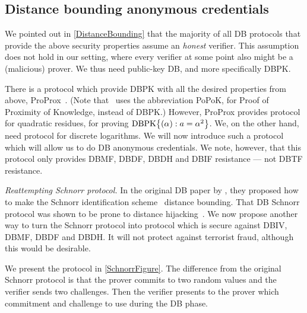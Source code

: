 \subsection{Distance bounding anonymous credentials}%
\label{DB-anon-cred}


We pointed out in \cref{DistanceBounding} that the majority of all \ac{DB} 
protocols that provide the above security properties assume an \emph{honest} 
verifier.
This assumption does not hold in our setting, where every verifier at some point 
also might be a (malicious) prover.
We thus need public-key \ac{DB}, and more specifically \ac{DBPK}.

There is a protocol which provide \ac{DBPK} with all the desired properties from 
above, ProProx~\cite{ProProx}.
(Note that~\cite{ProProx} uses the abbreviation PoPoK, for Proof of Proximity of 
Knowledge, instead of \ac{DBPK}.)
However, ProProx provides  protocol for quadratic residues, \ie for 
proving \(\DBPK[\alpha][a = \alpha^2]\).
We, on the other hand, need  protocol for discrete logarithms.
We will now introduce such a protocol which will allow us to do \ac{DB} 
anonymous credentials.
We note, however, that this protocol only provides \ac{DBMF}, \ac{DBDF}, 
\ac{DBDH} and \ac{DBIF} resistance --- \ie not \ac{DBTF} resistance.


\emph{Reattempting  Schnorr protocol.}
In the original \ac{DB} paper by \citet{DistanceBounding}, they proposed how to 
make the Schnorr identification scheme~\cite{Schnorr} distance bounding.
That \ac{DB} Schnorr protocol was shown to be prone to distance 
hijacking~\cite{DistanceHijacking}.
We now propose another way to turn the Schnorr protocol into  protocol 
which is secure against \ac{DBIV}, \ac{DBMF}, \ac{DBDF} and \ac{DBDH}.
It will not protect against terrorist fraud, although this would be desirable.

We present the protocol in \cref{SchnorrFigure}.
The difference from the original Schnorr protocol is that the prover commits to 
two random values and the verifier sends two challenges.
Then the verifier presents to the prover which commitment and challenge to use 
during the \ac{DB} phase.

